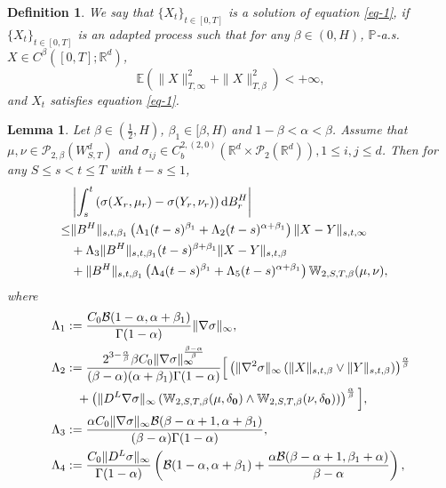 \documentclass[12pt]{article}
\newtheorem{lemma}[theorem]{Lemma}
\newtheorem{definition}[theorem]{Definition}
\def\R{\mathbb R}
\def\d{\text{\rm{d}}}
\def\E{\mathbb E}
\def\de{\delta}
\def\W{\mathbb{W}}
\numberwithin{equation}{section}
\begin{document}
	\begin{definition}
		We say that $\{X_t\}_{t\in[0,T]}$ is a solution of equation \eqref{eq-1}, if $\{X_t\}_{t\in[0,T]}$ is an adapted process such that for any $\beta\in(0,H)$, $\mathbb P$-a.s. $X\in C^{\beta}([0,T];\R^d)$,
		\begin{equation}\label{in-mom}
			\E\left(\|X\|_{T,\infty}^2+\|X\|_{T,\beta}^2\right)<+\infty,
		\end{equation}
		and $X_t$ satisfies equation \eqref{eq-1}.
	\end{definition}
	
	\begin{lemma}\label{lem-2.5}\cite[Lemma 3.7]{fan}
		Let $\beta\in (\frac 1 2,H)$, $\beta_1\in [\beta,H)$ and $1-\beta<\alpha<\beta$.
		Assume that  $\mu,\nu\in\mathscr P_{2,\beta}(W_{S,T}^d)$ and $\sigma_{ij}\in  C_b^{2,(2,0)}(\R^d\times\mathscr P_2(\R^d)), 1\leq i,j\leq d$.
		Then for any $S\leq s<t\leq T$ with $t-s\leq 1$,
		\begin{align*}
			&\left|\int_s^t\left(\sigma(X_r,\mu_r)-\sigma(Y_r,\nu_r)\right)\d B^H_r\right|\cr
			\le&\|B^H\|_{s,t,\beta_1} \left(\Lambda_1 (t-s)^{\beta_1}+\Lambda_2  (t-s)^{\alpha+\beta_1}\right)\|X-Y\|_{s,t,\infty}\cr
			&+\Lambda_3 \|B^H\|_{s,t,\beta_1} (t-s)^{\beta+\beta_1}\|X-Y\|_{s,t,\beta}\cr
			&+\|B^H\|_{s,t,\beta_1} \left(\Lambda_4 (t-s)^{\beta_1}+\Lambda_5 (t-s)^{\alpha+\beta_1}\right)\W_{2,S,T,\beta}(\mu ,\nu),
		\end{align*}
		where
		\begin{equation}\label{1-EsNoi}
			\begin{split}
			&\Lambda_1 := \frac {C_0\mathcal{B}(1-\alpha,\alpha+\beta_1)} {\Gamma(1-\alpha)} \|\nabla\sigma\|_\infty, \\
			&\Lambda_2 := \frac {2^{3-\frac {\alpha} {\beta}} \beta C_0\|\nabla\sigma\|_\infty^{\frac {\beta-\alpha} {\beta}}} {(\beta-\alpha)(\alpha+\beta_1)\Gamma(1-\alpha)}\Big[\left( \|\nabla^2\sigma\|_\infty \left( {\|X\|_{s,t,\beta}\vee\|Y\|_{s,t,\beta}} \right)\right)^{\frac {\alpha} {\beta}}\cr
			&\qquad +\left( \|D^L\nabla\sigma\|_\infty \left(\W_{2,S,T,\beta}(\mu,\de_{\bf 0})\wedge \W_{2,S,T,\beta}(\nu,\de_{\bf 0})\right)\right)^{\frac {\alpha} {\beta}} \Big], \\
			&\Lambda_3 :=\frac {\alpha C_0\|\nabla\sigma\|_\infty\mathcal{B}(\beta-\alpha+1,\alpha+\beta_1)} {(\beta-\alpha)\Gamma(1-\alpha)}, \\
			&\Lambda_4 :=\frac {C_0\|D^L \sigma\|_\infty } {\Gamma(1-\alpha)} \left( \mathcal{B}(1-\alpha,\alpha+\beta_1)+\frac {\alpha  \mathcal{B}(\beta-\alpha+1,\beta_1+\alpha)} {\beta-\alpha} \right), \cr

\end{split}
\end{equation}
\end{lemma}
\end{document}
